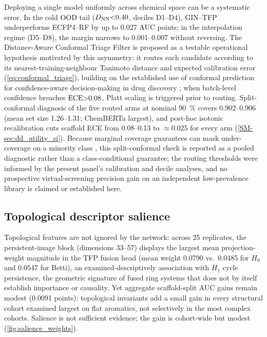 \documentclass[11pt,a4paper]{article}
\begin{document}
Deploying a single model uniformly across chemical space can be a systematic error. In the cold OOD tail ($D_{\text{NN}}\num{<0.40}$, deciles D1--D4), GIN--TFP underperforms ECFP4--RF by up to \num{0.027} AUC points; in the interpolation regime (D5--D8), the margin narrows to \numrange{0.001}{0.007} without reversing. The Distance-Aware Conformal Triage Filter is proposed as a testable operational hypothesis motivated by this asymmetry: it routes each candidate according to its nearest-training-neighbour Tanimoto distance and expected calibration error (\eqref{eq:conformal_triage}), building on the established use of conformal prediction for confidence-aware decision-making in drug discovery \citep{alvarsson2021predicting,eklund2015application}; when batch-level confidence breaches $\mathrm{ECE} \num{>0.08}$, Platt scaling is triggered prior to routing. Split-conformal diagnosis of the five routed arms at nominal \qty{90}{\percent} covers \numrange{0.902}{0.906} (mean set size \numrange{1.26}{1.31}; ChemBERTa largest), and post-hoc isotonic recalibration cuts scaffold ECE from \numrange{0.08}{0.13} to $\approx\num{0.025}$ for every arm (\cref{SM-sec:dd_utility_si}). Because marginal coverage guarantees can mask under-coverage on a minority class \citep{tursunbadalov2026quietfailure}, this split-conformal check is reported as a pooled diagnostic rather than a class-conditional guarantee; the routing thresholds were informed by the present panel's calibration and decile analyses, and no prospective virtual-screening precision gain on an independent low-prevalence library is claimed or established here.

\subsection{Topological descriptor salience}

Topological features are not ignored by the network: across \num{25} replicates, the persistent-image block (dimensions \numrange{33}{57}) displays the largest mean projection-weight magnitude in the TFP fusion head (mean weight \num{0.0790} vs.\ \num{0.0485} for $H_0$ and \num{0.0547} for Betti), an examined-descriptively association with $H_1$ cycle persistence, the geometric signature of fused ring systems that does not by itself establish importance or causality. Yet aggregate scaffold-split AUC gains remain modest (\num{0.0091} points): topological invariants add a small gain in every structural cohort examined largest on flat aromatics, not selectively in the most complex cohorts. Salience is not sufficient evidence; the gain is cohort-wide but modest (\cref{fig:salience_weights}).
\end{document}
